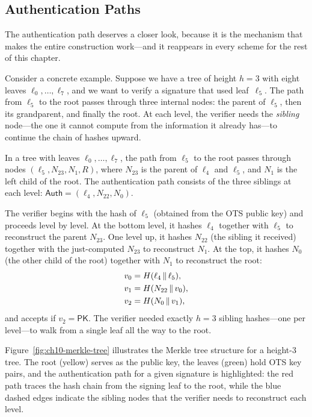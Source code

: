 \subsection{Authentication Paths}
\label{subsec:auth-paths}

The authentication path deserves a closer look, because it is the mechanism that makes the entire construction work---and it reappears in every scheme for the rest of this chapter.

Consider a concrete example.  Suppose we have a tree of height $h = 3$ with eight leaves $\ell_0, \ldots, \ell_7$, and we want to verify a signature that used leaf~$\ell_5$.  The path from $\ell_5$ to the root passes through three internal nodes: the parent of $\ell_5$, then its grandparent, and finally the root.  At each level, the verifier needs the \emph{sibling} node---the one it cannot compute from the information it already has---to continue the chain of hashes upward.

\begin{example}
\label{ex:auth-path}
In a tree with leaves $\ell_0, \ldots, \ell_7$, the path from $\ell_5$ to the root passes through nodes $(\ell_5, N_{23}, N_1, R)$, where $N_{23}$ is the parent of $\ell_4$ and $\ell_5$, and $N_1$ is the left child of the root.  The authentication path consists of the three siblings at each level: $\mathsf{Auth} = (\ell_4, N_{22}, N_0)$.

The verifier begins with the hash of $\ell_5$ (obtained from the OTS public key) and proceeds level by level.  At the bottom level, it hashes $\ell_4$ together with $\ell_5$ to reconstruct the parent $N_{23}$.  One level up, it hashes $N_{22}$ (the sibling it received) together with the just-computed $N_{23}$ to reconstruct $N_1$.  At the top, it hashes $N_0$ (the other child of the root) together with $N_1$ to reconstruct the root:
\begin{align}
v_0 &= H(\ell_4 \,\|\, \ell_5), \notag\\
v_1 &= H(N_{22} \,\|\, v_0), \notag\\
v_2 &= H(N_0 \,\|\, v_1), \notag
\end{align}
and accepts if $v_2 = \mathsf{PK}$.  The verifier needed exactly $h = 3$ sibling hashes---one per level---to walk from a single leaf all the way to the root.
\end{example}

Figure~\ref{fig:ch10-merkle-tree} illustrates the Merkle tree structure for a height-3 tree.  The root (yellow) serves as the public key, the leaves (green) hold OTS key pairs, and the authentication path for a given signature is highlighted: the red path traces the hash chain from the signing leaf to the root, while the blue dashed edges indicate the sibling nodes that the verifier needs to reconstruct each level.


